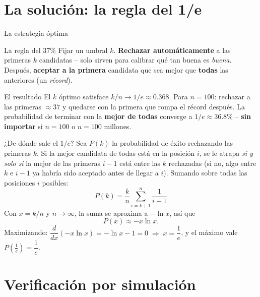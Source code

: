 \documentclass[aspectratio=169,10pt]{beamer}
\begin{document}
\section{La solución: la regla del 1/e}

\begin{frame}{La estrategia óptima}
  \begin{block}{La regla del 37\%}
    Fijar un umbral $k$. \textbf{Rechazar automáticamente} a las
    primeras $k$ candidatas -- solo sirven para calibrar qué tan buena
    es \emph{buena}. Después, \textbf{aceptar a la primera} candidata que
    sea mejor que \textbf{todas} las anteriores (un \emph{récord}).
  \end{block}
  \begin{alertblock}{El resultado}
    El $k$ óptimo satisface $k/n \to 1/e \approx 0.368$. Para $n=100$:
    rechazar a las primeras $\approx 37$ y quedarse con la primera que
    rompa el récord después. La probabilidad de terminar con la
    \textbf{mejor de todas} converge a $1/e\approx 36.8\%$ --
    \textbf{sin importar} si $n=100$ o $n=100$ millones.
  \end{alertblock}
\end{frame}

\begin{frame}{¿De dónde sale el $1/e$?}
  Sea $P(k)$ la probabilidad de éxito rechazando las primeras $k$. Si
  la mejor candidata de todas está en la posición $i$, se le atrapa
  \emph{si y solo si} la mejor de las primeras $i-1$ está entre las
  $k$ rechazadas (si no, algo entre $k$ e $i-1$ ya habría sido
  aceptado antes de llegar a $i$). Sumando sobre todas las posiciones
  $i$ posibles:
  \[
    P(k) = \frac{k}{n}\sum_{i=k+1}^{n}\frac{1}{i-1}
  \]
  Con $x=k/n$ y $n\to\infty$, la suma se aproxima a $-\ln x$, así que
  \[
    P(x) \approx -x\ln x .
  \]
  Maximizando: $\dfrac{d}{dx}(-x\ln x) = -\ln x - 1 = 0
  \;\Rightarrow\; x=\dfrac{1}{e}$, y el máximo vale
  $P\!\left(\tfrac1e\right) = \dfrac1e$.
\end{frame}

\section{Verificación por simulación}
\end{document}
